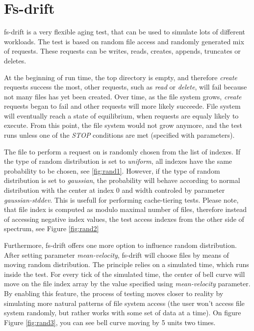\documentclass[
  color, %
  table, %
  lof,   %
  lot,   %
]{fithesis3}
\begin{document}
\section{Fs-drift}
fs-drift is a very flexible aging test, that can be used to simulate lots of different workloads. The test is based on random file access and randomly generated mix of requests. These requests can be writes, reads, creates, appends, truncates or deletes.

At the beginning of run time, the top directory is empty, and therefore \textit{create} requests success the most, other requests, such as \textit{read} or \textit{delete}, will fail because not many files has yet been created. Over time, as the file system grows, \textit{create} requests began to fail and other requests will more likely succeede. File system will eventually reach a state of equilibrium, when requests are equaly likely to execute. From this point, the file system would not grow anymore, and the test runs unless one of the \textit{STOP} conditions are met (specified with parameters).

The file to perform a request on is randomly chosen from the list of indexes. If the type of random distribution is set to \textit{uniform}, all indexes have the same probability to be chosen, see \ref{fig:rand1}. However, if the type of random distribution is set to \textit{gaussian}, the probability will behave according to normal distribution with the center at index 0 and width controled by parameter \textit{gaussian-stddev}. This is usefull for performing cache-tiering tests. Please note, that file index is computed as modulo maximal number of files, therefore instead of accessing negative index values, the test access indexes from the other side of spectrum, see Figure \ref{fig:rand2}

Furthermore, fs-drift offers one more option to influence random distribution. After setting parameter \textit{mean-velocity}, fs-drift will choose files by means of moving random distribution. The principle relies on a simulated time, which runs inside the test. For every tick of the simulated time, the center of bell curve will move on the file index array by the value specified using \textit{mean-velocity} parameter. By enabling this feature, the process of testing moves closer to reality by simulating more natural patterns of file system access (the user won't access file system randomly, but rather works with some set of data at a time). On figure Figure \ref{fig:rand3}, you can see bell curve moving by 5 units two times.
\end{document}
